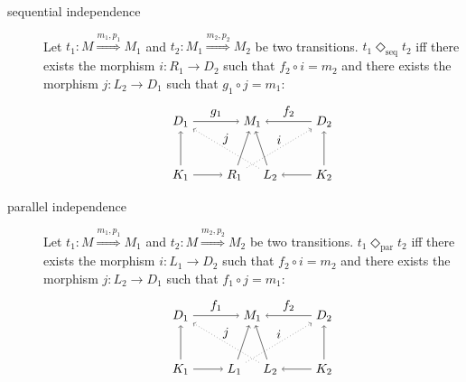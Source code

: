 \begin{definition}
  \label{def:indep}
  $~$
  \begin{description}
  \item[sequential independence]
    Let $t_1:M\overset{m_1,p_1}{\Rightarrow} M_1$ and $t_2:M_1\overset{m_2,p_2}{\Rightarrow} M_2$ be two transitions.
    $t_1 \Diamond_{\text{seq}} t_2$ iff there exists the morphism $i:R_1\to D_2$ such that $f_2\circ i= m_2$ and there exists the morphism $j:L_2\to D_1$ such that $g_1\circ j= m_1$:
    \[
    \begin{tikzpicture} %
    \node (r1) at (1.5,0) {\(R_1\)};
    \node (m1) at (2,1.5) {\(M_1\)};
    \node (l2) at (2.5,0) {\(L_2\)};
    \node (d1) at (0,1.5) {\(D_1\)};
    \node (k1) at (0,0) {\(K_1\)};
    \node (d2) at (4,1.5) {\(D_2\)};
    \node (k2) at (4,0) {\(K_2\)};
    \draw [->] (k1) -- (r1);
    \draw [->] (k2) -- (l2);
    \draw [->] (k1) -- (d1);
    \draw [->] (k2) -- (d2);
    \draw [->] (d1) -- node [above,midway] {\(g_1\)} (m1);
    \draw [->] (d2) -- node [above,midway] {\(f_2\)} (m1);
    \draw [->] (l2) -- (m1);
    \draw [->] (r1) -- (m1);
    \draw [dotted,->] (r1) -- node [above,midway] {\(i\)} (d2);
    \draw [dotted,->] (l2) -- node [above,midway] {\(j\)} (d1);
    \end{tikzpicture}
    \]
  \item[parallel independence]
    Let $t_1:M\overset{m_1,p_1}{\Rightarrow} M_1$ and $t_2:M\overset{m_2,p_2}{\Rightarrow} M_2$ be two transitions.
    $t_1 \Diamond_{\text{par}} t_2$ iff there exists the morphism $i:L_1\to D_2$ such that $f_2\circ i= m_2$ and there exists the morphism $j:L_2\to D_1$ such that $f_1\circ j= m_1$:
    \[
    \begin{tikzpicture} %
    \node (r1) at (1.5,0) {\(L_1\)};
    \node (m1) at (2,1.5) {\(M_1\)};
    \node (l2) at (2.5,0) {\(L_2\)};
    \node (d1) at (0,1.5) {\(D_1\)};
    \node (k1) at (0,0) {\(K_1\)};
    \node (d2) at (4,1.5) {\(D_2\)};
    \node (k2) at (4,0) {\(K_2\)};
    \draw [->] (k1) -- (r1);
    \draw [->] (k2) -- (l2);
    \draw [->] (k1) -- (d1);
    \draw [->] (k2) -- (d2);
    \draw [->] (d1) -- node [above,midway] {\(f_1\)} (m1);
    \draw [->] (d2) -- node [above,midway] {\(f_2\)} (m1);
    \draw [->] (l2) -- (m1);
    \draw [->] (r1) -- (m1);
    \draw [dotted,->] (r1) -- node [above,midway] {\(i\)} (d2);
    \draw [dotted,->] (l2) -- node [above,midway] {\(j\)} (d1);
    \end{tikzpicture}
    \]
  \end{description}

\end{definition}

